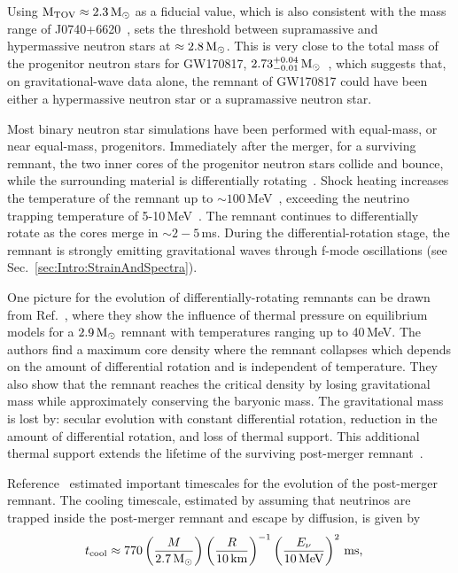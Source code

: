 \documentclass[../Thesis.tex]{subfiles}
\begin{document}
    Using $\mathrm{M_{TOV}}\approx 2.3\,\mathrm{M}_{\odot}$ as a fiducial value, which is also consistent with the mass range of J0740+6620~\cite{Cromartie2020}, sets the threshold between supramassive and hypermassive neutron stars at $\approx 2.8\,\mathrm{M}_{\odot}$. 
    This is very close to the total mass of the progenitor neutron stars for GW170817, $2.73^{+0.04}_{-0.01}\,\mathrm{M}_{\odot}$~\cite{GW170817Properties},  which suggests that, on gravitational-wave data alone, the remnant of GW170817 could have been either a hypermassive neutron star or a supramassive neutron star.\par
    
    Most binary neutron star simulations have been performed with equal-mass, or near equal-mass, progenitors.
    Immediately after the merger, for a surviving remnant, the two inner cores of the progenitor neutron stars collide and bounce, while the surrounding material is differentially rotating~\cite{Takami2015}.
    Shock heating increases the temperature of the remnant up to $\sim 100\,$MeV~\cite{Perego2019}, exceeding the neutrino trapping temperature of 5-10\,MeV~\cite{Alford2018b}.   
    The remnant continues to differentially rotate as the cores merge in $\sim 2-5\,$ms.
    During the differential-rotation stage, the remnant is strongly emitting gravitational waves through f-mode oscillations (see Sec.~\ref{sec:Intro:StrainAndSpectra}).
 \par
    
    One picture for the evolution of differentially-rotating remnants can be drawn from Ref.~\cite{Kaplan2014}, where they show the influence of thermal pressure on equilibrium models for a $2.9\,\mathrm{M}_{\odot}$ remnant with temperatures ranging up to 40\,MeV.
    The authors find a maximum core density where the remnant collapses which depends on the amount of differential rotation and is independent of temperature.
    They also show that the remnant reaches the critical density by losing gravitational mass while approximately conserving the baryonic mass.
    The gravitational mass is lost by: secular evolution with constant differential rotation, reduction in the amount of differential rotation, and loss of thermal support.
    This additional thermal support extends the lifetime of the surviving post-merger remnant~\cite[e.g.,][]{Bauswein2010}.
 \par
    
    Reference~\cite{Paschalidis2012} estimated important timescales for the evolution of the post-merger remnant.
    The cooling timescale, estimated by assuming that neutrinos are trapped inside the post-merger remnant and escape by diffusion, is given by
    \begin{align}
        t_{\mathrm{cool}} & \approx 770 \left(\frac{M}{2.7\,\mathrm{M}_{\odot}}\right)\left(\frac{R}{10\,\mathrm{km}}\right)^{-1}\left(\frac{E_\nu}{10\,\mathrm{MeV}}\right)^2\,\mathrm{ms}, \label{eq:Intro:NeutrinoCooling}        
    \end{align}    
\end{document}
